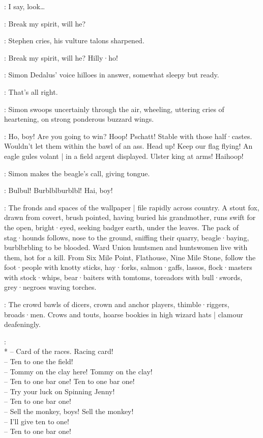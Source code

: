 \Bloom:
I say,
look…

\Stephen:
Break my spirit,
will he?
%

:
Stephen cries,
his vulture talons sharpened.

\Stephen:
Break my spirit,
will he?
Hilly·ho!

:
Simon Dedalus' voice hilloes in answer,
somewhat sleepy but ready.

\Simon:
That's all right.

:
Simon swoops uncertainly through the air,
wheeling,
uttering cries of heartening,
on strong ponderous buzzard wings.

\Simon:
Ho,
boy!
Are you going to win?
Hoop!
Pschatt!
Stable with those half·castes.
Wouldn't let them within the bawl of an ass.
Head up!
Keep our flag flying!
An eagle gules volant |
in a field argent displayed.
Ulster king at arms!
Haihoop!

:
Simon makes the beagle's call,
giving tongue.

\Simon:
Bulbul!
Burblblburblbl!
Hai,
boy!

:
The fronds and spaces of the wallpaper |
file rapidly across country.
A stout fox,
drawn from covert,
brush pointed,
having buried his grandmother,
runs swift for the open,
bright·eyed,
seeking badger earth,
under the leaves.
The pack of stag·hounds follows,
nose to the ground,
sniffing their quarry,
beagle·baying,
burblbrbling to be blooded.
Ward Union huntsmen and huntswomen live with them,
hot for a kill.
From Six Mile Point,
Flathouse,
Nine Mile Stone,
follow the foot·people with knotty sticks,
hay·forks,
salmon·gaffs,
lassos,
flock·masters with stock·whips,
bear·baiters with tomtoms,
toreadors with bull·swords,
grey·negroes waving torches.

:
The crowd bawls of dicers,
crown and anchor players,
thimble·riggers,
broads·men.
Crows and touts,
hoarse bookies in high wizard hats |
clamour deafeningly.

\Crowd:\\*
-- Card of the races. Racing card!\\
-- Ten to one the field!\\
-- Tommy on the clay here! Tommy on the clay!\\
-- Ten to one bar one! Ten to one bar one!\\
-- Try your luck on Spinning Jenny!\\
-- Ten to one bar one!%
\\
-- Sell the monkey, boys! Sell the monkey!\\
-- I'll give ten to one!\\
-- Ten to one bar one!

